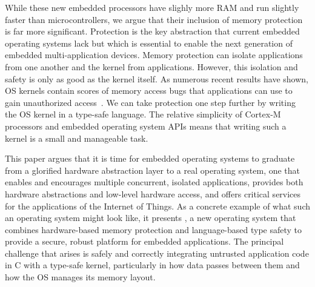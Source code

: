 While these new embedded processors have slighly more RAM and run slightly
faster than microcontrollers, we argue that their inclusion of memory
protection is far more significant. Protection is the key abstraction that
current embedded operating
systems lack but which is essential to enable the next generation
of embedded multi-application devices. Memory protection can isolate
applications from one another and the kernel from applications. However,
this isolation and safety is only as good as the kernel itself. As numerous
recent results have shown, OS kernels contain scores of memory access
bugs that
applications can use to gain unauthorized access~\cite{nickolai}. We can
take protection one step further by writing the OS kernel in a type-safe
language.  The
relative simplicity of Cortex-M processors and embedded operating system
APIs means that writing such a kernel is a small and manageable task.

This paper argues that it is time for embedded operating systems to graduate
from  a glorified
hardware abstraction layer to a real operating system,
one that enables and encourages multiple concurrent, isolated applications,
provides both hardware abstractions and low-level hardware access, and offers
critical services for the applications of the Internet of Things.
As a concrete example of what such an operating system might look like,
it presents \name, a new operating system that combines hardware-based
memory protection and language-based type safety to provide a secure,
robust platform for embedded applications. The principal challenge that
arises is safely and correctly integrating untrusted
application code in C with a type-safe kernel, particularly in
how data passes between them and how the OS manages its memory layout.

